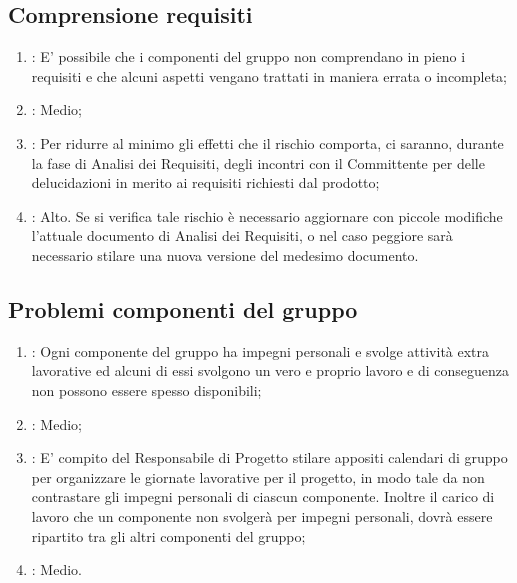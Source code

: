 \subsection{Comprensione requisiti}
\begin{enumerate}
\item {}: E' possibile che i componenti del gruppo non comprendano in pieno i requisiti e che alcuni aspetti vengano trattati in maniera errata o incompleta;
\item {}: Medio;
\item {}: Per ridurre al minimo gli effetti che il rischio comporta, ci saranno, durante la fase di Analisi dei Requisiti, degli incontri con il Committente per delle delucidazioni in merito ai requisiti richiesti dal prodotto;
\item {}: Alto. Se si verifica tale rischio è necessario aggiornare con piccole modifiche l'attuale documento di Analisi dei Requisiti, o nel caso peggiore sarà necessario stilare una nuova versione del medesimo documento.
\end{enumerate}

\subsection{Problemi componenti del gruppo}
\begin{enumerate}
\item {}: Ogni componente del gruppo ha impegni personali e svolge attività extra lavorative ed alcuni di essi svolgono un vero e proprio lavoro e di conseguenza non possono essere spesso disponibili;
\item {}: Medio;
\item {}: E' compito del Responsabile di Progetto stilare appositi calendari di gruppo per organizzare le giornate lavorative per il progetto, in modo tale da non contrastare gli impegni personali di ciascun componente. Inoltre il carico di lavoro che un componente non svolgerà per impegni personali, dovrà essere ripartito tra gli altri componenti del gruppo;
\item {}: Medio.
\end{enumerate}

